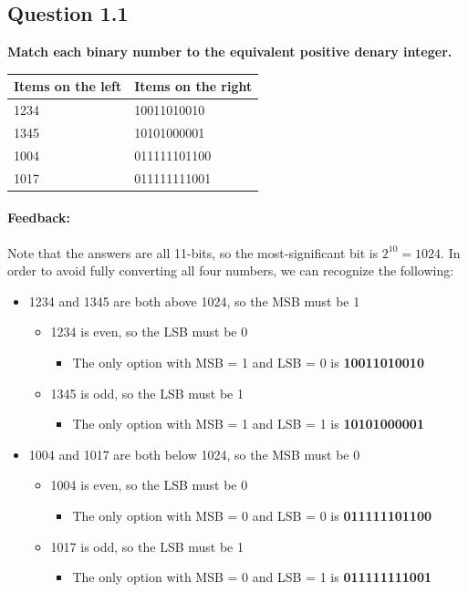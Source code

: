 \subsection{Question 1.1}
\textbf{Match each binary number to the equivalent positive denary integer.}

\begin{tabular}{|l|l|}
\hline
\textbf{Items on the left} & \textbf{Items on the right} \\
\hline
1234 & 10011010010 \\
1345 & 10101000001 \\
1004 & 011111101100 \\
1017 & 011111111001 \\
\hline
\end{tabular}

\paragraph{Feedback:}
Note that the answers are all 11-bits, so the most-significant bit is $2^{10} = 1024$. In order to avoid fully converting all four numbers, we can recognize the following:
\begin{itemize}
    \item 1234 and 1345 are both above 1024, so the MSB must be 1
    \begin{itemize}
        \item 1234 is even, so the LSB must be 0
        \begin{itemize}
            \item The only option with MSB = 1 and LSB = 0 is \textbf{10011010010}
        \end{itemize}
        \item 1345 is odd, so the LSB must be 1
        \begin{itemize}
            \item The only option with MSB = 1 and LSB = 1 is \textbf{10101000001}
        \end{itemize}
    \end{itemize}
    \item 1004 and 1017 are both below 1024, so the MSB must be 0
    \begin{itemize}
        \item 1004 is even, so the LSB must be 0
        \begin{itemize}
            \item The only option with MSB = 0 and LSB = 0 is \textbf{011111101100}
        \end{itemize}
        \item 1017 is odd, so the LSB must be 1
        \begin{itemize}
            \item The only option with MSB = 0 and LSB = 1 is \textbf{011111111001}
        \end{itemize}
    \end{itemize}
\end{itemize}

